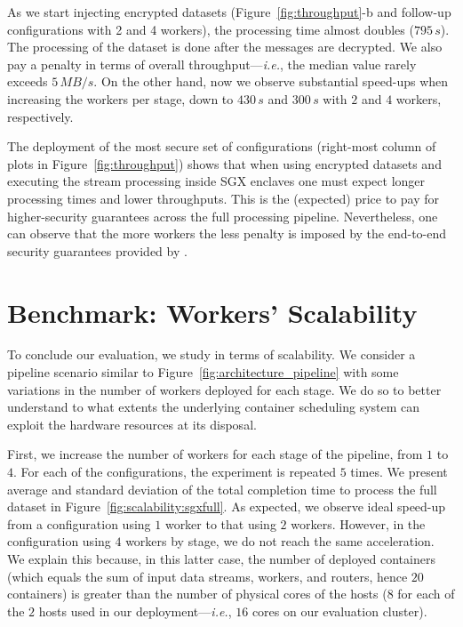 As we start injecting encrypted datasets (Figure~\ref{fig:throughput}-b and follow-up configurations with 2 and 4 workers), the processing time almost doubles ($795\,\mathit{s}$).
The processing of the dataset is done after the messages are decrypted.
We also pay a penalty in terms of overall throughput---\emph{i.e.}, the median value rarely exceeds $5\,\mathit{MB/s}$.
On the other hand, now we observe substantial speed-ups when increasing the workers per stage, down to $430\,\mathit{s}$ and $300\,\mathit{s}$ with $2$ and $4$ workers, respectively.

The deployment of the most secure set of configurations (right-most column of plots in Figure~\ref{fig:throughput}) shows that when using encrypted datasets and executing the stream processing inside SGX enclaves one must expect longer processing times and lower throughputs.
This is the (expected) price to pay for higher-security guarantees across the full processing pipeline.
Nevertheless, one can observe that the more workers the less penalty is imposed by the end-to-end security guarantees provided by \SS{}.





\section{Benchmark: Workers' Scalability}
To conclude our evaluation, we study \SS{} in terms of scalability.
We consider a pipeline scenario similar to Figure~\ref{fig:architecture_pipeline} with some variations in the number of workers deployed for each stage.
We do so to better understand to what extents the underlying container scheduling system can exploit the hardware resources at its disposal.

First, we increase the number of workers for each stage of the pipeline, from $1$ to $4$.
For each of the configurations, the experiment is repeated $5$ times.
We present average and standard deviation of the total completion time to process the full dataset in Figure~\ref{fig:scalability:sgxfull}.
As expected, we observe ideal speed-up from a configuration using $1$ worker to that using $2$ workers.
However, in the configuration using $4$ workers by stage, we do not reach the same acceleration.
We explain this because, in this latter case, the number of deployed containers (which equals the sum of input data streams, workers, and routers, hence $20$ containers) is greater than the number of physical cores of the hosts ($8$ for each of the $2$ hosts used in our deployment---\emph{i.e.}, $16$ cores on our evaluation cluster).

